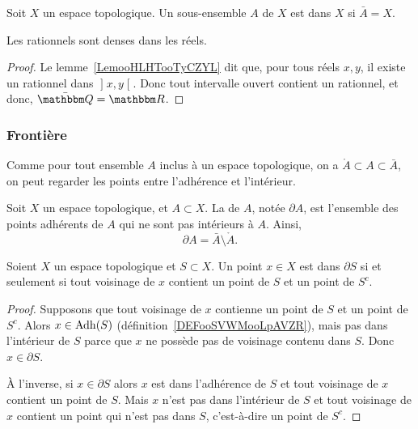 \begin{definition}\label{DefEnsembleDense}
  Soit \( X \) un espace topologique. Un sous-ensemble \( A \) de \( X \) est  dans \( X \) si \( \bar A = X\). 
\end{definition}

\begin{proposition}     \label{PropooUHNZooOUYIkn}
    Les rationnels sont denses dans les réels.
\end{proposition}

\begin{proof}
  Le lemme~\ref{LemooHLHTooTyCZYL} dit que, pour tous réels \( x, y \), il existe un rationnel dans \( \mathopen] x, y \mathclose[\). Donc tout intervalle ouvert contient un rationnel, et donc, \( \bar \eQ = \eR \).
\end{proof}

\subsubsection{Frontière}
Comme pour tout ensemble \( A \) inclus à un espace topologique, on a \( \mathring A \subset A \subset \bar A \), on peut regarder les points entre l'adhérence et l'intérieur.
\begin{definition}	\label{PropDescFrpbsmI}
  Soit \( X \) un espace topologique, et \( A \subset X \). La  de \( A \), notée \( \partial A \), est l'ensemble des points adhérents de \( A \) qui ne sont pas intérieurs à \( A \). Ainsi,
  \begin{equation}
    \partial A = \bar A \setminus \mathring A.
  \end{equation}
\end{definition}

\begin{lemma}      \label{LEMooEUYEooYcUfKr}
    Soient \( X\) un espace topologique et \( S\subset X\). Un point \( x\in X\) est dans \( \partial S\) si et seulement si tout voisinage de \( x\) contient un point de \( S\) et un point de \( S^c\).
\end{lemma}

\begin{proof}
    Supposons que tout voisinage de \( x\) contienne un point de \( S\) et un point de \( S^c\). Alors \( x\in \operatorname{Adh}(S)\) (définition~\ref{DEFooSVWMooLpAVZR}), mais pas dans l'intérieur de \( S\) parce que \( x\) ne possède pas de voisinage contenu dans \( S\). Donc \( x\in \partial S\).

    À l'inverse, si \( x\in\partial S\) alors \( x\) est dans l'adhérence de \( S\) et tout voisinage de \( x\) contient un point de \( S\). Mais \( x\) n'est pas dans l'intérieur de \( S\) et tout voisinage de \( x\) contient un point qui n'est pas dans \( S\), c'est-à-dire un point de \( S^c\).
\end{proof}

